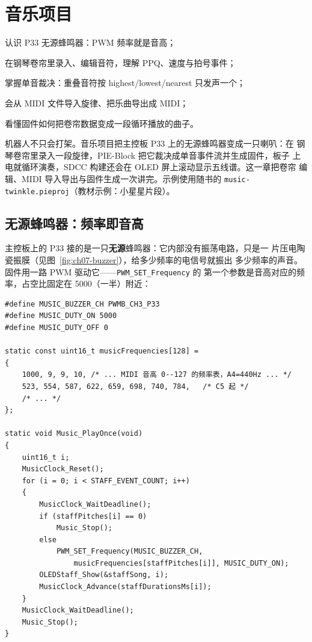 \chapter{音乐项目}
\label{ch:music}

\begin{introduction}
  \item 认识 P33 无源蜂鸣器：PWM 频率就是音高；
  \item 在钢琴卷帘里录入、编辑音符，理解 PPQ、速度与拍号事件；
  \item 掌握单音裁决：重叠音符按 highest/lowest/nearest 只发声一个；
  \item 会从 MIDI 文件导入旋律、把乐曲导出成 MIDI；
  \item 看懂固件如何把卷帘数据变成一段循环播放的曲子。
\end{introduction}

机器人不只会打架。音乐项目把主控板 P33 上的无源蜂鸣器变成一只喇叭：在
钢琴卷帘里录入一段旋律，PIE-Block 把它裁决成单音事件流并生成固件，板子
上电就循环演奏，SDCC 构建还会在 OLED 屏上滚动显示五线谱。这一章把卷帘
编辑、MIDI 导入导出与固件生成一次讲完。示例使用随书的
\texttt{music-twinkle.pieproj}（教材示例：小星星片段）。

\section{无源蜂鸣器：频率即音高}

主控板上的 P33 接的是一只\textbf{无源}蜂鸣器：它内部没有振荡电路，只是一
片压电陶瓷振膜（见图~\ref{fig:ch07-buzzer}），给多少频率的电信号就振出
多少频率的声音。固件用一路 PWM 驱动它——\texttt{PWM\_SET\_Frequency} 的
第一个参数是音高对应的频率，占空比固定在 5000（一半）附近：

\begin{lstlisting}[style=pieblockc,
  caption={音乐固件的发声核心：PWM 频率即音高（\texttt{music-twinkle.c} 节选）},
  label={lst:ch07-tone}]
#define MUSIC_BUZZER_CH PWMB_CH3_P33
#define MUSIC_DUTY_ON 5000
#define MUSIC_DUTY_OFF 0

static const uint16_t musicFrequencies[128] =
{
    1000, 9, 9, 10, /* ... MIDI 音高 0--127 的频率表，A4=440Hz ... */
    523, 554, 587, 622, 659, 698, 740, 784,   /* C5 起 */
    /* ... */
};

static void Music_PlayOnce(void)
{
    uint16_t i;
    MusicClock_Reset();
    for (i = 0; i < STAFF_EVENT_COUNT; i++)
    {
        MusicClock_WaitDeadline();
        if (staffPitches[i] == 0)
            Music_Stop();
        else
            PWM_SET_Frequency(MUSIC_BUZZER_CH,
                musicFrequencies[staffPitches[i]], MUSIC_DUTY_ON);
        OLEDStaff_Show(&staffSong, i);
        MusicClock_Advance(staffDurationsMs[i]);
    }
    MusicClock_WaitDeadline();
    Music_Stop();
}
\end{lstlisting}

